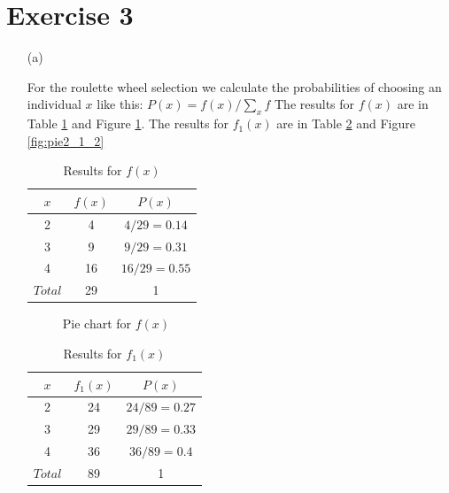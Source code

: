 \documentclass{scrartcl}
\begin{document}
\section*{Exercise 3}
\begin{itemize}
\item[(a)]

For the roulette wheel selection we calculate the probabilities of choosing an individual $x$ like this: $P(x) = f(x)/\sum_{x}f$
\newline
The results for $f(x)$ are in Table \ref{table:table2_1_1} and Figure \ref{fig:pie2_1_1}. The results for $f_1(x)$ are in Table \ref{table:table2_1_2} and Figure \ref{fig:pie2_1_2}


\begin{table}[h!]
\centering
\begin{tabular}{| c | c | c |}
\hline
$x$ & $f(x)$ & $P(x)$ \\
\hline
2 & 4 & $4/29 = 0.14$ \\
\hline
3 & 9 & $9/29 = 0.31$ \\
\hline
4 & 16 & $16/29 = 0.55$ \\
\hline
$Total$ & 29 & 1 \\
\hline
\end{tabular}
\caption{Results for $f(x)$}
\label{table:table2_1_1}
\end{table}

\begin{figure}[h!]
\centering

\caption{Pie chart for $f(x)$}
\label{fig:pie2_1_1}
\end{figure}

\begin{table}[h!]
\centering
\begin{tabular}{| c | c | c |}
 \hline
 $x$ & $f_1(x)$ & $P(x)$ \\
 \hline
 2 & 24 & $24/89 = 0.27$ \\
 \hline
 3 & 29 & $29/89 = 0.33$ \\
 \hline
 4 & 36 & $36/89 = 0.4$ \\
 \hline
 $Total$ & 89 & 1 \\
\hline
\end{tabular}
\caption{Results for $f_1(x)$}
\label{table:table2_1_2}
\end{table}


\end{itemize}
\end{document}
